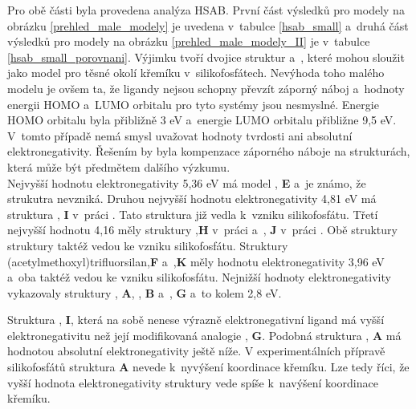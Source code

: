 \documentclass[
digital, %
table,   %
nolof,     %
nolot,     %
oneside,
]{fithesis3}
\begin{document}
Pro obě části byla provedena analýza HSAB. První část výsledků pro modely na obrázku \ref{prehled_male_modely} je uvedena v~tabulce \ref{hsab_small} a~druhá část výsledků pro modely na obrázku \ref{prehled_male_modely_II} je v~tabulce \ref{hsab_small_porovnani}. Výjimku tvoří dvojice struktur  a~, které mohou sloužit jako model pro těsné okolí křemíku v~silikofosfátech. Nevýhoda toho malého modelu je ovšem ta, že ligandy nejsou schopny převzít záporný náboj a~hodnoty energii HOMO a~LUMO orbitalu pro tyto systémy jsou nesmyslné. Energie HOMO orbitalu byla přibližně 3 eV a~energie LUMO orbitalu přibližne 9,5 eV. V~tomto případě nemá smysl uvažovat hodnoty tvrdosti ani absolutní elektronegativity. Řešením by byla kompenzace záporného náboje na strukturách, která může být předmětem dalšího výzkumu.\\

Nejvyšší hodnotu elektronegativity 5,36 eV má model , \textbf{E} a~je známo, že strukutra  nevzniká. Druhou nejvyšší hodnotu elektronegativity 4,81 eV má struktura , \textbf{I} v~práci \cite{jahnigen2012synthesis}. Tato struktura již vedla k~vzniku silikofosfátu. Třetí nejvyšší hodnotu 4,16 měly struktury ,\textbf{H} v~práci \cite{aksamentova2009synthesis} a~, \textbf{J} v~práci \cite{Styskalik2015thesis}. Obě struktury struktury taktéž vedou ke vzniku silikofosfátu. Struktury (acetylmethoxyl)trifluorsilan,\textbf{F} a~,\textbf{K} měly hodnotu elektronegativity 3,96 eV a~oba taktéž vedou ke vzniku silikofosfátu. Nejnižší hodnoty elektronegativity vykazovaly struktury , \textbf{A}, , \textbf{B} a~, \textbf{G} a~to kolem 2,8 eV.

Struktura , \textbf{I}, která na sobě nenese výrazně elektronegativní ligand má vyšší elektronegativitu než její modifikovaná analogie , \textbf{G}. Podobná struktura , \textbf{A} má hodnotou absolutní elektronegativity ještě níže. V experimentálních přípravě silikofosfátů struktura \textbf{A} nevede k~nyvýšení koordinace křemíku. Lze tedy říci, že vyšší hodnota elektronegativity struktury vede spíše k~navýšení koordinace křemíku.
\end{document}

